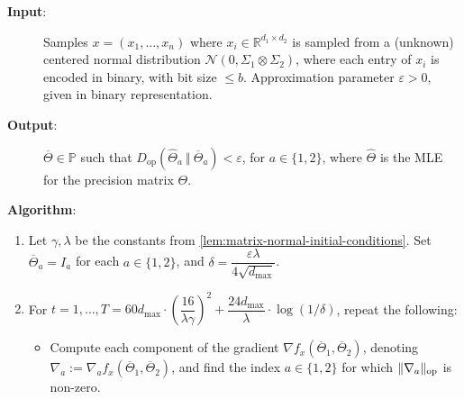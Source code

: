 \documentclass[aos]{imsart}
\theoremstyle{definition}
\numberwithin{equation}{section}
\DeclareMathOperator{\op}{op}
\DeclarePairedDelimiter{\norm}{\lVert}{\rVert}
\newcommand{\R}{{\mathbb{R}}}
\newcommand{\otheta}{\overline{\Theta}}
\newcommand{\htheta}{\widehat{\Theta}}
\newcommand{\ot}{\otimes}
\newcommand{\eps}{\varepsilon}
\newcommand{\cN}{\mathcal{N}}
\newcommand{\SPD}{\mathbb{P}}
\newcommand{\samp}{x}
\newcommand{\Dop}{D_{\operatorname{op}}}
\def\dmax{d_{\max}}
\begin{document}



\begin{Algorithm}
\begin{description}
\item[\hspace{.2cm}\textbf{Input}:] Samples $\samp = (\samp_1, \ldots, \samp_n)$ where $\samp_i \in \R^{d_1 \times d_2}$ is sampled from a (unknown) centered normal distribution $\cN(0, \Sigma_1 \ot \Sigma_2)$, where each entry of $\samp_i$ is encoded in binary, with bit size $\le b$. Approximation parameter $\eps > 0$, given in binary representation. \\[.3ex]

\item[\hspace{.2cm}\textbf{Output}:] $\otheta \in \SPD$ such that $\Dop(\htheta_a \ \Vert  \  \otheta_a) < \eps$, for $a \in \{1,2\}$, where $\htheta$ is the MLE for the precision matrix $\Theta$. \\[.3ex]

\item[\hspace{.2cm}\textbf{Algorithm}:]
\end{description}
\begin{enumerate}
\item\label{it:flip-flop step 1 matrix} Let $\gamma, \lambda$ be the constants from \cref{lem:matrix-normal-initial-conditions}. Set $\otheta_a = I_a$ for each $a \in \{1,2\}$, and $\delta = \dfrac{\eps \lambda}{4 \sqrt{\dmax}}$.

\vspace{5pt}

\item\label{it:flip-flop step 2 matrix} For $t=1,\dots,T = 60 \dmax \cdot \left( \dfrac{16}{\lambda \gamma} \right)^2 + \dfrac{24 \dmax}{\lambda} \cdot \log(1/\delta)$, repeat the following:

\vspace{5pt}

\begin{itemize}
\item Compute each component of the gradient $\nabla f_{\samp}(\otheta_1, \otheta_2)$, denoting $\nabla_a := \nabla_a f_{\samp}(\otheta_1, \otheta_2)$, and find the index $a \in \{1,2\}$ for which $\norm{\nabla_a}_{\op}$ is non-zero.


\end{itemize}
\end{enumerate}
\end{Algorithm}
\end{document}
